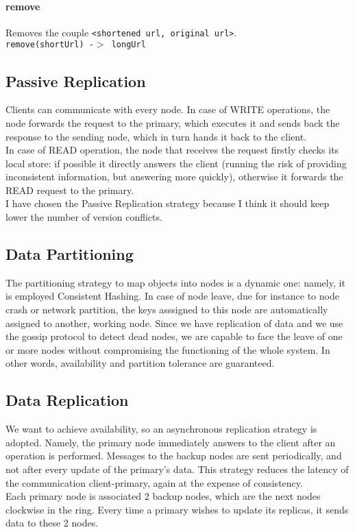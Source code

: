 \documentclass{article}
\begin{document}
\paragraph{remove}
Removes the couple \texttt{<shortened url, original url>}.\\
\texttt{remove(shortUrl) -$>$  longUrl}


\subsection{Passive Replication}
Clients can communicate with every node. In case of WRITE operations, the node forwards the request to the primary, which executes it and sends back the response to the sending node, which in turn hands it back to the client. \\
In case of READ operation, the node that receives the request firstly checks its local store: if possible it directly answers the client (running the risk of providing inconsistent information, but answering more quickly), otherwise it forwards the READ request to the primary. \\
I have chosen the Passive Replication strategy because I think it should keep lower the number of version conflicts.

\subsection{Data Partitioning}
The partitioning strategy to map objects into nodes is a dynamic one: namely, it is employed Consistent Hashing. In case of node leave, due for instance to node crash or network partition, the keys asssigned to this node are automatically assigned to another, working node. Since we have replication of data and we use the gossip protocol to detect dead nodes, we are capable to face the leave of one or more nodes without compromising the functioning of the whole system. In other words, availability and partition tolerance are guaranteed.

\subsection{Data Replication}
We want to achieve availability, so an asynchronous replication strategy is adopted. Namely, the primary node immediately answers to the client after an operation is performed. Messages to the backup nodes are sent periodically, and not after every update of the primary's data. This strategy reduces the latency of the communication client-primary, again at the expense of consistency. \\
Each primary node is associated 2 backup nodes, which are the next nodes clockwise in the ring. Every time a primary wishes to update its replicas, it sends data to these 2 nodes.
\end{document}
